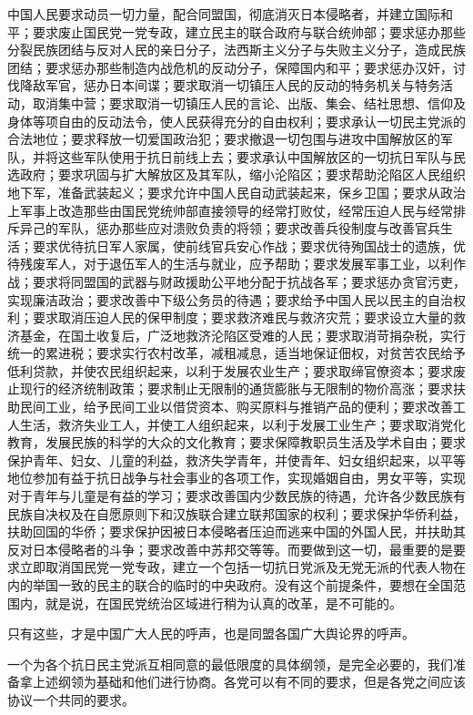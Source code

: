 中国人民要求动员一切力量，配合同盟国，彻底消灭日本侵略者，并建立国际和平；要求废止国民党一党专政，建立民主的联合政府与联合统帅部；要求惩办那些分裂民族团结与反对人民的亲日分子，法西斯主义分子与失败主义分子，造成民族团结；要求惩办那些制造内战危机的反动分子，保障国内和平；要求惩办汉奸，讨伐降敌军官，惩办日本间谍；要求取消一切镇压人民的反动的特务机关与特务活动，取消集中营；要求取消一切镇压人民的言论、出版、集会、结社思想、信仰及身体等项自由的反动法令，使人民获得充分的自由权利；要求承认一切民主党派的合法地位；要求释放一切爱国政治犯；要求撤退一切包围与进攻中国解放区的军队，并将这些军队使用于抗日前线上去；要求承认中国解放区的一切抗日军队与民选政府；要求巩固与扩大解放区及其军队，缩小沦陷区；要求帮助沦陷区人民组织地下军，准备武装起义；要求允许中国人民自动武装起来，保乡卫国；要求从政治上军事上改造那些由国民党统帅部直接领导的经常打败仗，经常压迫人民与经常排斥异己的军队，惩办那些应对溃败负责的将领；要求改善兵役制度与改善官兵生活；要求优待抗日军人家属，使前线官兵安心作战；要求优待殉国战士的遗族，优待残废军人，对于退伍军人的生活与就业，应予帮助；要求发展军事工业，以利作战；要求将同盟国的武器与财政援助公平地分配于抗战各军；要求惩办贪官污吏，实现廉洁政治；要求改善中下级公务员的待遇；要求给予中国人民以民主的自治权利；要求取消压迫人民的保甲制度；要求救济难民与救济灾荒；要求设立大量的救济基金，在国土收复后，广泛地救济沦陷区受难的人民；要求取消苛捐杂税，实行统一的累进税；要求实行农村改革，减租减息，适当地保证佃权，对贫苦农民给予低利贷款，并使农民组织起来，以利于发展农业生产；要求取缔官僚资本；要求废止现行的经济统制政策；要求制止无限制的通货膨胀与无限制的物价高涨；要求扶助民间工业，给予民间工业以借贷资本、购买原料与推销产品的便利；要求改善工人生活，救济失业工人，并使工人组织起来，以利于发展工业生产；要求取消党化教育，发展民族的科学的大众的文化教育；要求保障教职员生活及学术自由；要求保护青年、妇女、儿童的利益，救济失学青年，并使青年、妇女组织起来，以平等地位参加有益于抗日战争与社会事业的各项工作，实现婚姻自由，男女平等，实现对于青年与儿童是有益的学习；要求改善国内少数民族的待遇，允许各少数民族有民族自决权及在自愿原则下和汉族联合建立联邦国家的权利；要求保护华侨利益，扶助回国的华侨；要求保护因被日本侵略者压迫而逃来中国的外国人民，并扶助其反对日本侵略者的斗争；要求改善中苏邦交等等。而要做到这一切，最重要的是要求立即取消国民党一党专政，建立一个包括一切抗日党派及无党无派的代表人物在内的举国一致的民主的联合的临时的中央政府。没有这个前提条件，要想在全国范围内，就是说，在国民党统治区域进行稍为认真的改革，是不可能的。

只有这些，才是中国广大人民的呼声，也是同盟各国广大舆论界的呼声。

一个为各个抗日民主党派互相同意的最低限度的具体纲领，是完全必要的，我们准备拿上述纲领为基础和他们进行协商。各党可以有不同的要求，但是各党之间应该协议一个共同的要求。

